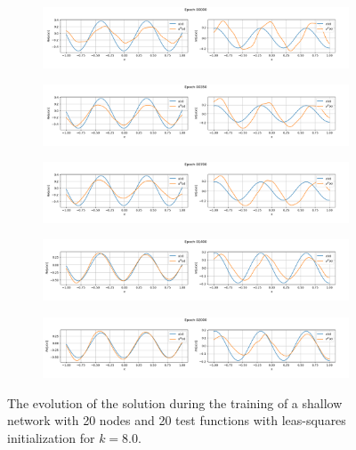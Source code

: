 \begin{figure}[h!]
    \centering
    \begin{subfigure}[b]{0.85\textwidth}
        \includegraphics[width=\textwidth]{img/evolution_lsinit/sol-00000.png}
    \end{subfigure}
    \vfill
    \begin{subfigure}[b]{0.85\textwidth}
        \includegraphics[width=\textwidth]{img/evolution_lsinit/sol-00350.png}
    \end{subfigure}
    \vfill
    \begin{subfigure}[b]{0.85\textwidth}
        \includegraphics[width=\textwidth]{img/evolution_lsinit/sol-00700.png}
    \end{subfigure}
    \vfill
    \begin{subfigure}[b]{0.85\textwidth}
        \includegraphics[width=\textwidth]{img/evolution_lsinit/sol-01400.png}
    \end{subfigure}
    \vfill
    \begin{subfigure}[b]{0.85\textwidth}
        \includegraphics[width=\textwidth]{img/evolution_lsinit/sol-02000.png}
    \end{subfigure}
    \caption{The evolution of the solution during the training of a shallow network with 20 nodes and 20 test functions with leas-squares initialization for $k=8.0$.}
    \label{fig:evolutionlsinitsol}
\end{figure}